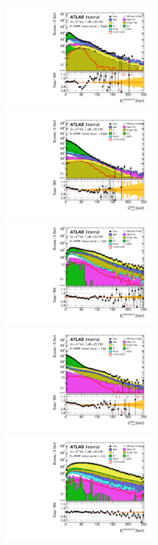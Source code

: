 \begin{figure}
	\includegraphics[width=0.495\textwidth]{tex/selection/emme_CutZVeto_0jet_MET_TrackHWW_Clj_mh125_log}
	\hfill
	\includegraphics[width=0.495\textwidth]{tex/selection/eemm_CutZVeto_0jet_METRel_mh125_log}
	\\
	\includegraphics[width=0.495\textwidth]{tex/selection/emme_CutZVeto_1jet_MET_TrackHWW_Clj_mh125_log}
	\hfill
	\includegraphics[width=0.495\textwidth]{tex/selection/eemm_CutZVeto_1jet_METRel_mh125_log}
	\\
	\includegraphics[width=0.495\textwidth]{tex/selection/emme_CutZVeto_2jetincl_MET_TrackHWW_Clj_mh125_log}

\end{figure}
